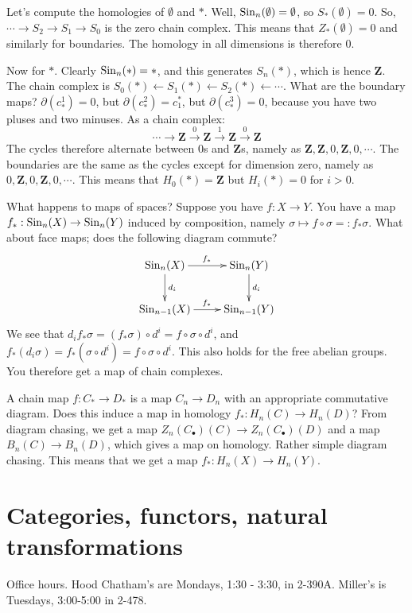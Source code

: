 Let's compute the homologies of $\emptyset$ and $\ast$. Well, $\mathrm{Sin}_n(\emptyset)=\emptyset$, so $S_\ast(\emptyset)=0$. So, $\cdots\to S_2\to S_1\to S_0$ is the zero chain complex. This means that $Z_\ast(\emptyset)=0$ and similarly for boundaries. The homology in all dimensions is therefore $0$.

Now for $\ast$. Clearly $\mathrm{Sin}_n(\ast)=\ast$, and this generates $S_n(\ast)$, which is hence $\mathbf{Z}$. The chain complex is $S_0(\ast)\leftarrow S_1(\ast)\leftarrow S_2(\ast)\leftarrow\cdots$. What are the boundary maps? $\partial(c^1_\ast)=0$, but $\partial(c^2_\ast)=c_1^\ast$, but $\partial (c^3_\ast)=0$, because you have two pluses and two minuses. As a chain complex:
$$\cdots\to\mathbf{Z}\xrightarrow{0}\mathbf{Z}\xrightarrow{1}\mathbf{Z}\xrightarrow{0}\mathbf{Z}$$
The cycles therefore alternate between $0$s and $\mathbf{Z}$s, namely as $\mathbf{Z},\mathbf{Z},0,\mathbf{Z},0,\cdots$. The boundaries are the same as the cycles except for dimension zero, namely as $0,\mathbf{Z},0,\mathbf{Z},0,\cdots$. This means that $ H_0(\ast)=\mathbf{Z}$ but $ H_i(\ast)=0$ for $i>0$.

What happens to maps of spaces? Suppose you have $f:X\to Y$. You have a map $f_\ast:\mathrm{Sin}_n(X)\to\mathrm{Sin}_n(Y)$ induced by composition, namely $\sigma\mapsto f\circ \sigma=:f_\ast\sigma$. What about face maps; does the following diagram commute?
\begin{eqnarray*}
\xymatrix{\Sin_n(X)\ar[r]^{f_\ast}\ar[d]^{d_i} & \Sin_n(Y)\ar[d]^{d_i}\\
\Sin_{n-1}(X)\ar[r]^{f_\ast} & \Sin_{n-1}(Y)}
\end{eqnarray*}
We see that $d_if_\ast\sigma=(f_\ast\sigma)\circ d^i=f\circ\sigma\circ d^i$, and $f_\ast(d_i\sigma)=f_\ast(\sigma\circ d^i)=f\circ\sigma\circ d^i$. This also holds for the free abelian groups. You therefore get a map of chain complexes.

A chain map $f:C_\ast\to D_\ast$ is a map $C_n\to D_n$ with an appropriate commutative diagram. Does this induce a map in homology $f_\ast: H_n(C)\to H_n(D)$? From diagram chasing, we get a map $Z_n(C_\bullet)(C)\to Z_n(C_\bullet)(D)$ and a map $B_n(C)\to B_n(D)$, which gives a map on homology. Rather simple diagram chasing. This means that we get a map $f_\ast: H_n(X)\to H_n(Y)$.
\section{Categories, functors, natural transformations}
Office hours. Hood Chatham's are Mondays, 1:30 - 3:30, in 2-390A. Miller's is Tuesdays, 3:00-5:00 in 2-478.

